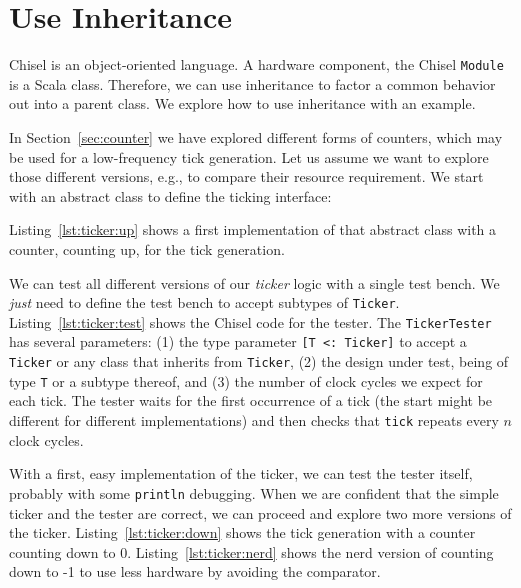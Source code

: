 \documentclass[%
    10pt,
    headinclude, footexclude,
    openright, %
    notitlepage,
    cleardoubleempty,
    headsepline,
    pointlessnumbers,
    bibtotoc, idxtotoc,
    ]{scrbook}
\newcommand{\code}[1]{{\small{\texttt{#1}}}}
\begin{document}

\section{Use Inheritance}
\label{sec:inheritance}


Chisel is an object-oriented language. A hardware component, the Chisel \code{Module}
is a Scala class. Therefore, we can use inheritance to factor a common behavior
out into a parent class. We explore how to use inheritance with an example.

In Section~\ref{sec:counter} we have explored different forms of counters,
which may be used for a low-frequency tick generation. Let us assume we want to
explore those different versions, e.g., to compare their resource requirement.
We start with an abstract class to define the ticking interface:


\noindent Listing~\ref{lst:ticker:up} shows a first implementation of that abstract class
with a counter, counting up, for the tick generation.


We can test all different versions of our \emph{ticker} logic with a single test bench.
We \emph{just} need to define the test bench to accept subtypes of \code{Ticker}.
Listing~\ref{lst:ticker:test} shows the Chisel code for the tester.
The \code{TickerTester} has several parameters: (1) the type parameter
\code{[T <: Ticker]} to accept a \code{Ticker} or any class that inherits from \code{Ticker},
(2) the design under test, being of type \code{T} or a subtype thereof,
and (3) the number of clock cycles we expect for each tick.
The tester waits for the first occurrence of a tick (the start might be different for
different implementations) and then checks that \code{tick} repeats every $n$ clock cycles.


With a first, easy implementation of the ticker, we can test the tester
itself, probably with some \code{println} debugging. When we are confident that
the simple ticker and the tester are correct, we can proceed and explore
two more versions of the ticker. Listing~\ref{lst:ticker:down} shows the tick
generation with a counter counting down to 0.
Listing~\ref{lst:ticker:nerd} shows the nerd version of counting down to -1 to use
less hardware by avoiding the comparator.
\end{document}
